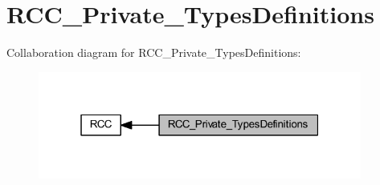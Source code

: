 \hypertarget{group___r_c_c___private___types_definitions}{}\section{R\+C\+C\+\_\+\+Private\+\_\+\+Types\+Definitions}
\label{group___r_c_c___private___types_definitions}
Collaboration diagram for R\+C\+C\+\_\+\+Private\+\_\+\+Types\+Definitions\+:
\nopagebreak
\begin{figure}[H]
\begin{center}
\leavevmode
\includegraphics[width=301pt]{group___r_c_c___private___types_definitions}
\end{center}
\end{figure}
